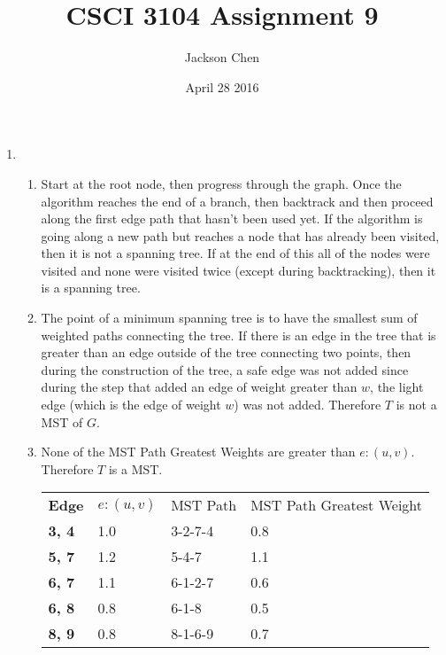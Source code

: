 \documentclass[11pt, letterpaper]{article}
\newcommand{\subtitle}[1]{
  \posttitle{
    \par\end{center}
    \begin{center}\large#1\end{center}
    \vskip0.5em}
}
\begin{document}
  \title{CSCI 3104 Assignment 9}
    \subtitle{10:00 - 10:50 Wanshan}
    \date{April 28 2016}
    \author{Jackson Chen}
    \maketitle

  \begin{enumerate}
    \item
      \begin{enumerate}
        \item
            Start at the root node, then progress through the graph. Once the algorithm reaches the end of a branch,
            then backtrack and then proceed along the first edge path that hasn't been used yet. If the algorithm is going
            along a new path but reaches a node that has already been visited, then it is not a spanning tree. If at the end of this
            all of the nodes were visited and none were visited twice (except during backtracking), then it is a spanning tree.
        \item
          The point of a minimum spanning tree is to have the smallest sum of weighted paths connecting the tree. If there is an edge
          in the tree that is greater than an edge outside of the tree connecting two points, then during the construction of the tree,
          a safe edge was not added since during the step that added an edge of weight greater than $w$, the light edge (which is the
          edge of weight $w$) was not added. Therefore $T$ is not a MST of $G$.
        \item
          None of the MST Path Greatest Weights are greater than $e: (u, v)$. Therefore $T$ is a MST.
          \begin{table}[h]
          \centering
          \begin{tabular}{llll}
          \textbf{Edge}     & $e: (u, v)$     & MST Path        & MST Path Greatest Weight   \\
          \textbf{3, 4}     & 1.0               & 3-2-7-4       & 0.8                \\
          \textbf{5, 7}     & 1.2               & 5-4-7         & 1.1                \\
          \textbf{6, 7}     & 1.1               & 6-1-2-7       & 0.6                \\
          \textbf{6, 8}     & 0.8               & 6-1-8         & 0.5       \\
          \textbf{8, 9}     & 0.8               & 8-1-6-9       & 0.7         \\

\end{tabular}
\end{table}
\end{enumerate}
\end{enumerate}
\end{document}
